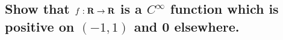 \begin{parts}
    \part{
        Show that $f:\mathbf{R}\to\mathbf{R}$ is a
        $C^\infty$ function which is
        positive on $(-1,1)$ and 0
        elsewhere.
    }
    \begin{solution}
        
    \end{solution}
\end{parts}